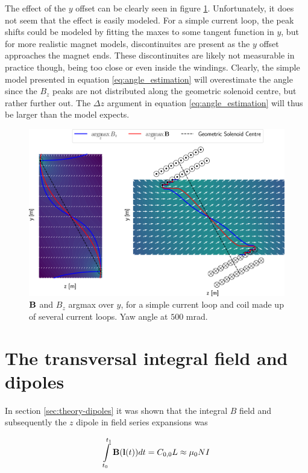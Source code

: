 The effect of the $y$ offset can be clearly seen in figure
\ref{fig:sim-mag-fieldmap-argmax}. Unfortunately, it does not seem
that the effect is easily modeled. For a simple current loop, the peak 
shifts could be modeled by fitting the maxes to some tangent function
in $y$, but for more realistic magnet models, discontinuites are present as
the $y$ offset approaches the magnet ends. These discontinuites are
likely not measurable in practice though, being too close or even
inside the windings.
Clearly, the simple model
presented in equation \ref{eq:angle_estimation} will overestimate
the angle since the $B_z$ peaks are not distributed along the geometric
solenoid centre, but rather further out. The $\Delta z$ argument in
equation \ref{eq:angle_estimation} will thus be larger than the model 
expects.


\begin{figure}[h!]
    \centering
    \includegraphics[width=\linewidth]{figs/sim-fieldmap}
    \caption{$\vb{B}$ and $B_z$ argmax over $y$, for a simple current
    loop and coil made up of several current loops. Yaw angle at $500$ mrad.}
    \label{fig:sim-mag-fieldmap-argmax}
\end{figure}

\section{The transversal integral field and dipoles}
\label{sec:dipole-simulations}
In section \ref{sec:theory-dipoles} it was shown that the integral
$B$ field and subsequently the $z$ dipole in field 
series expansions was


\begin{equation}
    \int \limits_{t_0}^{t_1} \vb{B}(\vb{l}(t))dt = C_{0,0}L \approx \mu_0 NI
    \label{eq:Bzlineint}
\end{equation}

